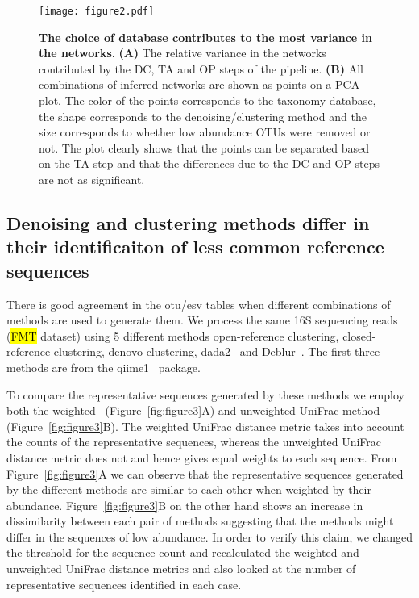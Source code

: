   \begin{figure}
    \centering
    \texttt{[image: figure2.pdf]}
    \caption{
      \textbf{The choice of database contributes to the most variance in the networks}.
      \textbf{(A)} The relative variance in the networks contributed by the DC, TA and OP steps of the pipeline.
      \textbf{(B)} All combinations of inferred networks are shown as points on a PCA plot. The color of the points corresponds to the taxonomy database, the shape corresponds to the denoising/clustering method and the size corresponds to whether low abundance OTUs were removed or not.
      The plot clearly shows that the points can be separated based on the TA step and that the differences due to the DC and OP steps are not as significant.
    }
    \label{fig:figure2}
  \end{figure}

  \FloatBarrier

  \subsection*{Denoising and clustering methods differ in their identificaiton of less common reference sequences}

  There is good agreement in the \ac{otu}/\ac{esv} tables when different combinations of methods are used to generate them.
  We process the same 16S sequencing reads (\hl{FMT} dataset) using 5 different methods \- open-reference clustering, closed-reference clustering, denovo clustering, \ac{dada2}~\cite{Callahan2016} and Deblur~\cite{Amir2017}.
  The first three methods are from the \ac{qiime1}~\cite{Caporaso2010} package.

  To compare the representative sequences generated by these methods we employ both the weighted~\cite{Lozupone2007} (Figure~\ref{fig:figure3}A) and unweighted UniFrac method~\cite{Lozupone2005} (Figure~\ref{fig:figure3}B).
  The weighted UniFrac distance metric takes into account the counts of the representative sequences, whereas the unweighted UniFrac distance metric does not and hence gives equal weights to each sequence.
  From Figure~\ref{fig:figure3}A we can observe that the representative sequences generated by the different methods are similar to each other when weighted by their abundance.
  Figure~\ref{fig:figure3}B on the other hand shows an increase in dissimilarity between each pair of methods suggesting that the methods might differ in the sequences of low abundance.
  In order to verify this claim, we changed the threshold for the sequence count and recalculated the weighted and unweighted UniFrac distance metrics and also looked at the number of representative sequences identified in each case. 

